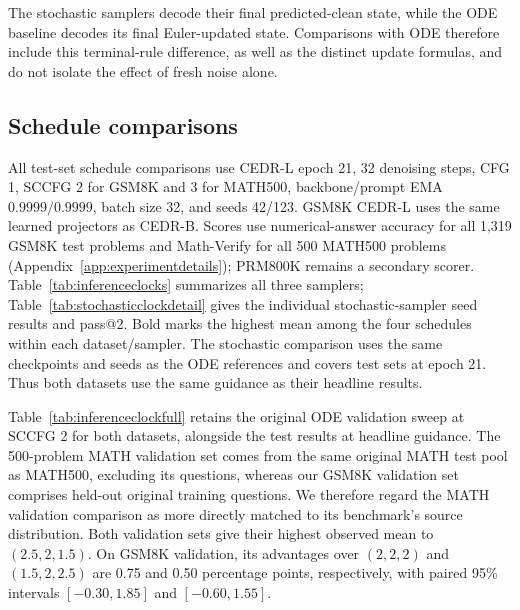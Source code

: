 \documentclass[11pt,letterpaper]{article}
\begin{document}
The stochastic samplers decode their final predicted-clean state, while the ODE baseline decodes its final Euler-updated state. Comparisons with ODE therefore include this terminal-rule difference, as well as the distinct update formulas, and do not isolate the effect of fresh noise alone.

\subsection{Schedule comparisons}
\label{app:schedulecomparisons}
All test-set schedule comparisons use CEDR-L epoch 21, 32 denoising steps, CFG 1, SCCFG 2 for GSM8K and 3 for MATH500, backbone/prompt EMA $0.9999/0.9999$, batch size 32, and seeds 42/123. GSM8K CEDR-L uses the same learned projectors as CEDR-B. Scores use numerical-answer accuracy for all 1,319 GSM8K test problems and Math-Verify for all 500 MATH500 problems (Appendix~\ref{app:experimentdetails}); PRM800K remains a secondary scorer. Table~\ref{tab:inferenceclocks} summarizes all three samplers; Table~\ref{tab:stochasticclockdetail} gives the individual stochastic-sampler seed results and pass@2. Bold marks the highest mean among the four schedules within each dataset/sampler. The stochastic comparison uses the same checkpoints and seeds as the ODE references and covers test sets at epoch 21. Thus both datasets use the same guidance as their headline results.

Table~\ref{tab:inferenceclockfull} retains the original ODE validation sweep at SCCFG 2 for both datasets, alongside the test results at headline guidance. The 500-problem MATH validation set comes from the same original MATH test pool as MATH500, excluding its questions, whereas our GSM8K validation set comprises held-out original training questions. We therefore regard the MATH validation comparison as more directly matched to its benchmark's source distribution. Both validation sets give their highest observed mean to $(2.5,2,1.5)$. On GSM8K validation, its advantages over $(2,2,2)$ and $(1.5,2,2.5)$ are 0.75 and 0.50 percentage points, respectively, with paired 95\% intervals $[-0.30,1.85]$ and $[-0.60,1.55]$.
\end{document}
